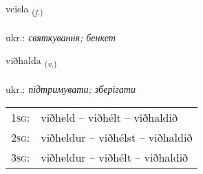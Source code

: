 \documentclass[frontgrid, backgrid]{flacards}\usepackage[]{graphicx}\usepackage[]{xcolor}
\begin{document}
\renewcommand{\flhead}{\vskip5pt \fboxsep=0pt {\small\bfseries\footnotesize Nafnorð | іменник}}
\renewcommand{\fcfoot}{\vskip5pt \fboxsep=0pt \hspace{2pt}{\small\bfseries\footnotesize 2K}}

\renewcommand{\blhead}{\vskip5pt {\small\bfseries\footnotesize Nafnorð | іменник }}
\renewcommand{\bcfoot}{\vskip5pt \hspace{2pt}{\small\bfseries\footnotesize 2K}}


{veisla \small{\textsubscript{(\textit{f.})}} \\[1ex] %
\textphonetic{[veistla]} \\
ukr.: \emph{святкування; бенкет} \\  [2ex]
\renewcommand*{\arraystretch}{0.8}
}

\renewcommand{\flhead}{\vskip5pt \fboxsep=0pt {\small\bfseries\footnotesize Sagnorð | дієслово}}
\renewcommand{\fcfoot}{\vskip5pt \fboxsep=0pt \hspace{2pt}{\small\bfseries\footnotesize 2K}}

\renewcommand{\blhead}{\vskip5pt {\small\bfseries\footnotesize Sagnorð | дієслово }}
\renewcommand{\bcfoot}{\vskip5pt \hspace{2pt}{\small\bfseries\footnotesize 2K}}


{viðhalda \small{\textsubscript{(\textit{v.})}} \\[1ex] %
\textphonetic{[vɪθhalta]} \\
ukr.: \emph{підтримувати; зберігати} \\  [2ex]
\renewcommand*{\arraystretch}{0.8}
\begin{tabular}{p{1cm}l}
\textsc{1sg}: & viðheld -- viðhélt -- viðhaldið \\ 
\textsc{2sg}: & viðheldur -- viðhélst -- viðhaldið \\ 
\textsc{3sg}: & viðheldur -- viðhélt -- viðhaldið \\ 
\end{tabular}
}
\end{document}
